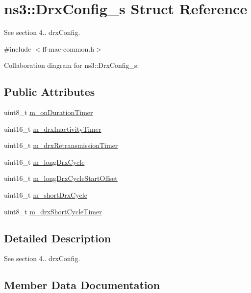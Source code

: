 \hypertarget{structns3_1_1DrxConfig__s}{}\section{ns3\+:\+:Drx\+Config\+\_\+s Struct Reference}
\label{structns3_1_1DrxConfig__s}


See section 4.. drx\+Config.  




{\ttfamily \#include $<$ff-\/mac-\/common.\+h$>$}



Collaboration diagram for ns3\+:\+:Drx\+Config\+\_\+s\+:
\subsection*{Public Attributes}
\begin{DoxyCompactItemize}
\item 
uint8\+\_\+t \hyperlink{structns3_1_1DrxConfig__s_aec35b05342ab4b47d0c4ce4f6a7dfc11}{m\+\_\+on\+Duration\+Timer}
\item 
uint16\+\_\+t \hyperlink{structns3_1_1DrxConfig__s_a1bd26fbbb6c1494702c44402d949b3ba}{m\+\_\+drx\+Inactivity\+Timer}
\item 
uint16\+\_\+t \hyperlink{structns3_1_1DrxConfig__s_a55af99223fb4e79b8c634ff7ffe37c0b}{m\+\_\+drx\+Retransmission\+Timer}
\item 
uint16\+\_\+t \hyperlink{structns3_1_1DrxConfig__s_a1d343318e4655f459c2f9b0ab5355e4a}{m\+\_\+long\+Drx\+Cycle}
\item 
uint16\+\_\+t \hyperlink{structns3_1_1DrxConfig__s_a0da782d97d2a346c7eed2cfa79030999}{m\+\_\+long\+Drx\+Cycle\+Start\+Offset}
\item 
uint16\+\_\+t \hyperlink{structns3_1_1DrxConfig__s_a9c94423a6a2c8ea9226ca7678d2082be}{m\+\_\+short\+Drx\+Cycle}
\item 
uint8\+\_\+t \hyperlink{structns3_1_1DrxConfig__s_a1f09d2274f644943e6e2f60a5384080a}{m\+\_\+drx\+Short\+Cycle\+Timer}
\end{DoxyCompactItemize}


\subsection{Detailed Description}
See section 4.. drx\+Config. 

\subsection{Member Data Documentation}
